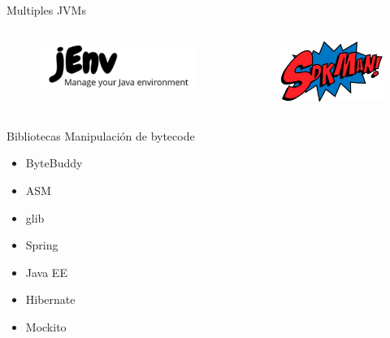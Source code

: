 \documentclass[aspectratio=169]{beamer}
\begin{document}
\begin{frame}[fragile]{Multiples JVMs}
\begin{columns}[T] %
    
    \begin{column}[T]{5cm} %
        \begin{figure}
            \centering
            \includegraphics[width=\linewidth]{Images/jenv}
        \end{figure}
    \end{column}
    \begin{column}[T]{6cm} %
        \begin{figure}
            \centering
            \includegraphics[width=\linewidth]{Images/sdkman}
        \end{figure}
    \end{column}
\end{columns}
\end{frame}

\begin{frame}[fragile]{Bibliotecas}
    Manipulación de bytecode
    \begin{itemize}
        \item ByteBuddy
        \item ASM
        \item glib
        \item Spring
        \item Java EE
        \item Hibernate
        \item Mockito
    \end{itemize}
\end{frame}
\end{document}
